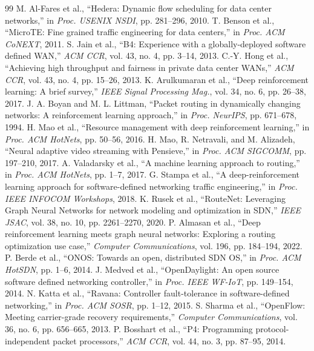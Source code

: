 \documentclass[12pt,a4paper,oneside]{report}
\begin{document}
\begin{thebibliography}{99}
 M. Al-Fares et al., ``Hedera: Dynamic flow scheduling for data center networks,'' in \textit{Proc. USENIX NSDI}, pp. 281--296, 2010.
 T. Benson et al., ``MicroTE: Fine grained traffic engineering for data centers,'' in \textit{Proc. ACM CoNEXT}, 2011.
 S. Jain et al., ``B4: Experience with a globally-deployed software defined WAN,'' \textit{ACM CCR}, vol. 43, no. 4, pp. 3--14, 2013.
 C.-Y. Hong et al., ``Achieving high throughput and fairness in private data center WANs,'' \textit{ACM CCR}, vol. 43, no. 4, pp. 15--26, 2013.
 K. Arulkumaran et al., ``Deep reinforcement learning: A brief survey,'' \textit{IEEE Signal Processing Mag.}, vol. 34, no. 6, pp. 26--38, 2017.
 J. A. Boyan and M. L. Littman, ``Packet routing in dynamically changing networks: A reinforcement learning approach,'' in \textit{Proc. NeurIPS}, pp. 671--678, 1994.
 H. Mao et al., ``Resource management with deep reinforcement learning,'' in \textit{Proc. ACM HotNets}, pp. 50--56, 2016.
 H. Mao, R. Netravali, and M. Alizadeh, ``Neural adaptive video streaming with Pensieve,'' in \textit{Proc. ACM SIGCOMM}, pp. 197--210, 2017.
 A. Valadarsky et al., ``A machine learning approach to routing,'' in \textit{Proc. ACM HotNets}, pp. 1--7, 2017.
 G. Stampa et al., ``A deep-reinforcement learning approach for software-defined networking traffic engineering,'' in \textit{Proc. IEEE INFOCOM Workshops}, 2018.
 K. Rusek et al., ``RouteNet: Leveraging Graph Neural Networks for network modeling and optimization in SDN,'' \textit{IEEE JSAC}, vol. 38, no. 10, pp. 2261--2270, 2020.
 P. Almasan et al., ``Deep reinforcement learning meets graph neural networks: Exploring a routing optimization use case,'' \textit{Computer Communications}, vol. 196, pp. 184--194, 2022.
 P. Berde et al., ``ONOS: Towards an open, distributed SDN OS,'' in \textit{Proc. ACM HotSDN}, pp. 1--6, 2014.
 J. Medved et al., ``OpenDaylight: An open source software defined networking controller,'' in \textit{Proc. IEEE WF-IoT}, pp. 149--154, 2014.
 N. Katta et al., ``Ravana: Controller fault-tolerance in software-defined networking,'' in \textit{Proc. ACM SOSR}, pp. 1--12, 2015.
 S. Sharma et al., ``OpenFlow: Meeting carrier-grade recovery requirements,'' \textit{Computer Communications}, vol. 36, no. 6, pp. 656--665, 2013.
 P. Bosshart et al., ``P4: Programming protocol-independent packet processors,'' \textit{ACM CCR}, vol. 44, no. 3, pp. 87--95, 2014.
\end{thebibliography}
\end{document}
